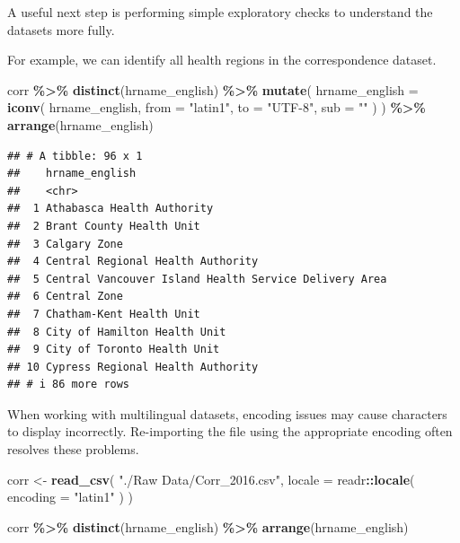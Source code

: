 \documentclass[
  11pt,
  oneside]{book}
\newenvironment{Shaded}{\begin{snugshade}}{\end{snugshade}}
\newcommand{\AttributeTok}[1]{\textcolor[rgb]{0.13,0.29,0.53}{#1}}
\newcommand{\FunctionTok}[1]{\textcolor[rgb]{0.13,0.29,0.53}{\textbf{#1}}}
\newcommand{\NormalTok}[1]{#1}
\newcommand{\OtherTok}[1]{\textcolor[rgb]{0.56,0.35,0.01}{#1}}
\newcommand{\SpecialCharTok}[1]{\textcolor[rgb]{0.81,0.36,0.00}{\textbf{#1}}}
\newcommand{\StringTok}[1]{\textcolor[rgb]{0.31,0.60,0.02}{#1}}
\begin{document}
A useful next step is performing simple exploratory checks to understand the datasets more fully.

For example, we can identify all health regions in the correspondence dataset.

\begin{Shaded}
\begin{Highlighting}[]
\NormalTok{corr }\SpecialCharTok{\%\textgreater{}\%}
  \FunctionTok{distinct}\NormalTok{(hrname\_english) }\SpecialCharTok{\%\textgreater{}\%}
  \FunctionTok{mutate}\NormalTok{(}
    \AttributeTok{hrname\_english =} \FunctionTok{iconv}\NormalTok{(}
\NormalTok{      hrname\_english,}
      \AttributeTok{from =} \StringTok{"latin1"}\NormalTok{,}
      \AttributeTok{to =} \StringTok{"UTF{-}8"}\NormalTok{,}
      \AttributeTok{sub =} \StringTok{""}
\NormalTok{    )}
\NormalTok{  ) }\SpecialCharTok{\%\textgreater{}\%}
  \FunctionTok{arrange}\NormalTok{(hrname\_english)}
\end{Highlighting}
\end{Shaded}

\begin{verbatim}
## # A tibble: 96 x 1
##    hrname_english                                       
##    <chr>                                                
##  1 Athabasca Health Authority                           
##  2 Brant County Health Unit                             
##  3 Calgary Zone                                         
##  4 Central Regional Health Authority                    
##  5 Central Vancouver Island Health Service Delivery Area
##  6 Central Zone                                         
##  7 Chatham-Kent Health Unit                             
##  8 City of Hamilton Health Unit                         
##  9 City of Toronto Health Unit                          
## 10 Cypress Regional Health Authority                    
## # i 86 more rows
\end{verbatim}

When working with multilingual datasets, encoding issues may cause characters to display incorrectly. Re-importing the file using the appropriate encoding often resolves these problems.

\begin{Shaded}
\begin{Highlighting}[]
\NormalTok{corr }\OtherTok{\textless{}{-}} \FunctionTok{read\_csv}\NormalTok{(}
  \StringTok{"./Raw Data/Corr\_2016.csv"}\NormalTok{,}
  \AttributeTok{locale =}\NormalTok{ readr}\SpecialCharTok{::}\FunctionTok{locale}\NormalTok{(}
    \AttributeTok{encoding =} \StringTok{"latin1"}
\NormalTok{  )}
\NormalTok{)}

\NormalTok{corr }\SpecialCharTok{\%\textgreater{}\%}
  \FunctionTok{distinct}\NormalTok{(hrname\_english) }\SpecialCharTok{\%\textgreater{}\%}
  \FunctionTok{arrange}\NormalTok{(hrname\_english)}
\end{Highlighting}
\end{Shaded}
\end{document}
